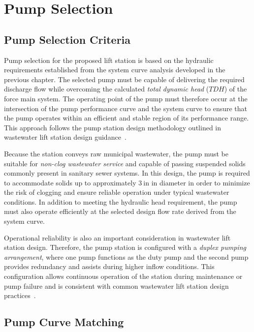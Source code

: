 \section{Pump Selection}
\subsection{Pump Selection Criteria}

Pump selection for the proposed lift station is based on the hydraulic requirements established from the system curve analysis developed in the previous chapter. The selected pump must be capable of delivering the required discharge flow while overcoming the calculated \textit{total dynamic head} ($TDH$) of the force main system. The operating point of the pump must therefore occur at the intersection of the pump performance curve and the system curve to ensure that the pump operates within an efficient and stable region of its performance range. This approach follows the pump station design methodology outlined in wastewater lift station design guidance~\cite{ProjectD_Colebrooke_2020}.

Because the station conveys raw municipal wastewater, the pump must be suitable for \textit{non-clog wastewater service} and capable of passing suspended solids commonly present in sanitary sewer systems. In this design, the pump is required to accommodate solids up to approximately $3~\text{in}$ in diameter in order to minimize the risk of clogging and ensure reliable operation under typical wastewater conditions. In addition to meeting the hydraulic head requirement, the pump must also operate efficiently at the selected design flow rate derived from the system curve.

Operational reliability is also an important consideration in wastewater lift station design. Therefore, the pump station is configured with a \textit{duplex pumping arrangement}, where one pump functions as the duty pump and the second pump provides redundancy and assists during higher inflow conditions. This configuration allows continuous operation of the station during maintenance or pump failure and is consistent with common wastewater lift station design practices~\cite{ProjectD_Colebrooke_2020}.


\subsection{Pump Curve Matching}

